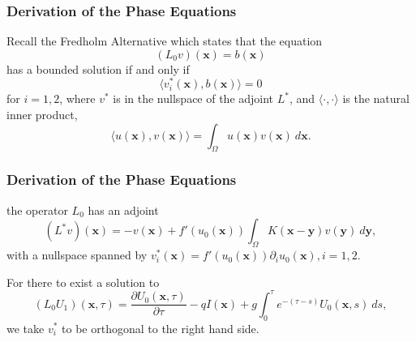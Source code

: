 \documentclass{beamer}
\newcommand{\x}{\mathbf{x}}
\newcommand{\y}{\mathbf{y}}
\newcommand{\io}{\int_\Omega}
\newcommand{\pa}{\partial}
\begin{document}
\begin{frame}[noframenumbering]
\frametitle{Derivation of the Phase Equations}
Recall the Fredholm Alternative which states that the equation
\[
(L_0v)(\x) = b(\x)
\]   
has a bounded solution if and only if
\[
\langle v^*_i(\x), b(\x)\rangle =0
\]
for $i=1,2$, where $v^*$ is in the nullspace of the adjoint $L^*$, and $\langle \cdot,\cdot \rangle$ is the natural inner product,
\[
\langle u(\x),v(\x) \rangle = \io u(\x)v(\x) \ d\x .
\]
\end{frame}

\begin{frame}[noframenumbering]
\frametitle{Derivation of the Phase Equations}

the operator $L_0$ has an adjoint
\[
(L^*v)(\x) =-v(\x) + f'(u_0(\x)) \io K(\x-\y)v(\y)\ d\y,
\] 
with a nullspace spanned by $v^*_i(\x)=f'(u_0(\x))\pa_i u_0(\x), i=1,2$.

For there to exist a solution to
\[
(L_0U_1)(\x,\tau) = \frac{\partial U_0(\x,\tau)}{\partial \tau} - q I(\x) + g \int_0^\tau e^{-(\tau-s)}U_0(\x,s)\ ds,
\]
we take $v^*_i$ to be orthogonal to the right hand side.
\end{frame}
\end{document}
